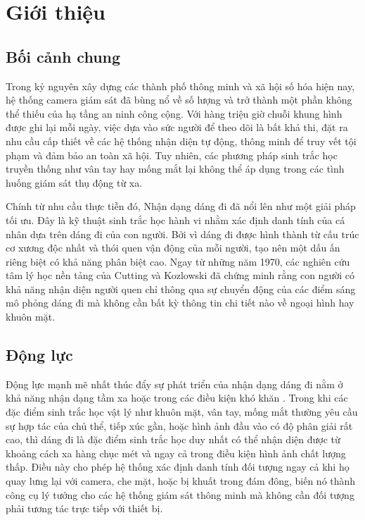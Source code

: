 \chapter{Giới thiệu}
\label{Chapter1}

\section{Bối cảnh chung}

Trong kỷ nguyên xây dựng các thành phố thông minh và xã hội số hóa hiện nay, hệ thống camera giám sát đã bùng nổ về số lượng và trở thành một phần không thể thiếu của hạ tầng an ninh công cộng. Với hàng triệu giờ chuỗi khung hình được ghi lại mỗi ngày, việc dựa vào sức người để theo dõi là bất khả thi, đặt ra nhu cầu cấp thiết về các hệ thống nhận diện tự động, thông minh để truy vết tội phạm và đảm bảo an toàn xã hội. Tuy nhiên, các phương pháp sinh trắc học truyền thống như vân tay hay mống mắt lại không thể áp dụng trong các tình huống giám sát thụ động từ xa.

Chính từ nhu cầu thực tiễn đó, Nhận dạng dáng đi đã nổi lên như một giải pháp tối ưu. Đây là kỹ thuật sinh trắc học hành vi nhằm xác định danh tính của cá nhân dựa trên dáng đi của con người. Bởi vì dáng đi được hình thành từ cấu trúc cơ xương độc nhất và thói quen vận động của mỗi người, tạo nên một dấu ấn riêng biệt có khả năng phân biệt cao. Ngay từ những năm 1970, các nghiên cứu tâm lý học nền tảng của Cutting và Kozlowski đã chứng minh rằng con người có khả năng nhận diện người quen chỉ thông qua sự chuyển động của các điểm sáng mô phỏng dáng đi mà không cần bất kỳ thông tin chi tiết nào về ngoại hình hay khuôn mặt\cite{Sarkar_Gait_Handbook_2008}.

\section{Động lực}

Động lực mạnh mẽ nhất thúc đẩy sự phát triển của nhận dạng dáng đi nằm ở khả năng nhận dạng tầm xa hoặc trong các điều kiện khó khăn \cite{sepas2022deep,shen2023comprehensivesurveydeepgait}. Trong khi các đặc điểm sinh trắc học vật lý như khuôn mặt, vân tay, mống mắt thường yêu cầu sự hợp tác của chủ thể, tiếp xúc gần, hoặc hình ảnh đầu vào có độ phân giải rất cao, thì dáng đi là đặc điểm sinh trắc học duy nhất có thể nhận diện được từ khoảng cách xa hàng chục mét và ngay cả trong điều kiện hình ảnh chất lượng thấp. Điều này cho phép hệ thống xác định danh tính đối tượng ngay cả khi họ quay lưng lại với camera, che mặt, hoặc bị khuất trong đám đông, biến nó thành công cụ lý tưởng cho các hệ thống giám sát thông minh mà không cần đối tượng phải tương tác trực tiếp với thiết bị.

